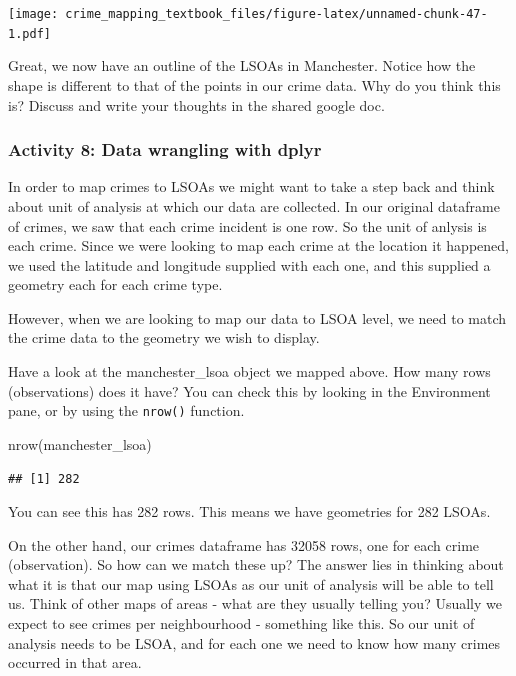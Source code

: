 \documentclass[
]{book}
\newenvironment{Shaded}{\begin{snugshade}}{\end{snugshade}}
\newcommand{\FunctionTok}[1]{\textcolor[rgb]{0.00,0.00,0.00}{#1}}
\newcommand{\NormalTok}[1]{#1}
\begin{document}
\texttt{[image: crime\_mapping\_textbook\_files/figure-latex/unnamed-chunk-47-1.pdf]}

Great, we now have an outline of the LSOAs in Manchester. Notice how the shape is different to that of the points in our crime data. Why do you think this is? Discuss and write your thoughts in the shared google doc.

\hypertarget{activity-8-data-wrangling-with-dplyr}{%
\subsubsection{Activity 8: Data wrangling with dplyr}\label{activity-8-data-wrangling-with-dplyr}}

In order to map crimes to LSOAs we might want to take a step back and think about unit of analysis at which our data are collected. In our original dataframe of crimes, we saw that each crime incident is one row. So the unit of anlysis is each crime. Since we were looking to map each crime at the location it happened, we used the latitude and longitude supplied with each one, and this supplied a geometry each for each crime type.

However, when we are looking to map our data to LSOA level, we need to match the crime data to the geometry we wish to display.

Have a look at the manchester\_lsoa object we mapped above. How many rows (observations) does it have? You can check this by looking in the Environment pane, or by using the \texttt{nrow()} function.

\begin{Shaded}
\begin{Highlighting}[]
\FunctionTok{nrow}\NormalTok{(manchester\_lsoa)}
\end{Highlighting}
\end{Shaded}

\begin{verbatim}
## [1] 282
\end{verbatim}

You can see this has 282 rows. This means we have geometries for 282 LSOAs.

On the other hand, our crimes dataframe has 32058 rows, one for each crime (observation). So how can we match these up? The answer lies in thinking about what it is that our map using LSOAs as our unit of analysis will be able to tell us. Think of other maps of areas - what are they usually telling you? Usually we expect to see crimes per neighbourhood - something like this. So our unit of analysis needs to be LSOA, and for each one we need to know how many crimes occurred in that area.
\end{document}
